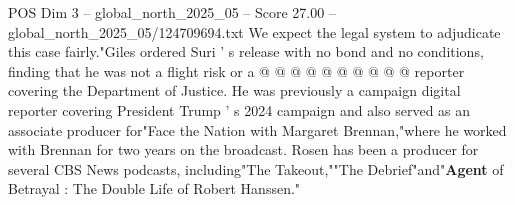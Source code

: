 \begin{textsample}{POS Dim 3 – global\_north\_2025\_05 – Score 27.00 – global\_north\_2025\_05/124709694.txt}
We expect the legal system to adjudicate this case fairly."Giles ordered Suri ' s release with no bond and no conditions, finding that he was not a flight risk or a @ @ @ @ @ @ @ @ @ @ reporter covering the Department of Justice.
He was previously a campaign digital reporter covering President Trump ' s 2024 campaign and also served as an associate producer for"Face the Nation with Margaret Brennan,"where he worked with Brennan for two years on the broadcast.
Rosen has been a producer for several CBS News podcasts, including"The Takeout,""The Debrief"and"\textbf{Agent} of Betrayal : The Double Life of Robert Hanssen."

\end{textsample}

